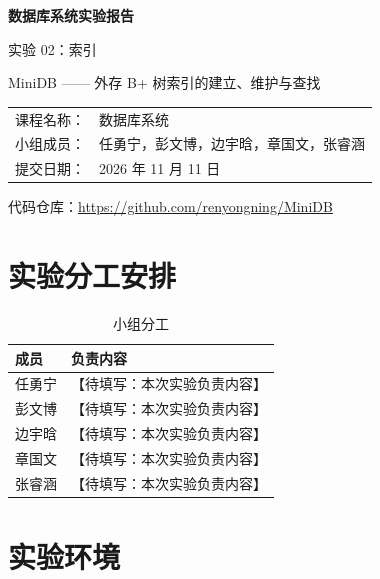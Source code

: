 \documentclass[11pt,a4paper]{ctexart}
\newcommand{\TODO}[1]{\textcolor{todo}{【待填写：#1】}}
\begin{document}
\begin{titlepage}
  \centering
  \vspace*{3cm}
  {\Huge\bfseries 数据库系统实验报告\par}
  \vspace{1cm}
  {\LARGE 实验 02：索引\par}
  \vspace{0.6cm}
  {\large MiniDB —— 外存 B+ 树索引的建立、维护与查找\par}
  \vspace{3cm}
  \begin{tabular}{rl}
    课程名称： & 数据库系统 \\[4pt]
    小组成员： & 任勇宁，彭文博，边宇晗，章国文，张睿涵 \\[4pt]
    提交日期： & 2026 年 11 月 11 日 \\
  \end{tabular}
  \vfill
  {\small 代码仓库：\url{https://github.com/renyongning/MiniDB}\par}
\end{titlepage}

\tableofcontents
\newpage

\section{实验分工安排}

\begin{table}[H]
  \centering
  \caption{小组分工}
  \begin{tabularx}{\textwidth}{l X}
    \toprule
    成员 & 负责内容 \\
    \midrule
    任勇宁 & \TODO{本次实验负责内容} \\
    彭文博 & \TODO{本次实验负责内容} \\
    边宇晗 & \TODO{本次实验负责内容} \\
    章国文 & \TODO{本次实验负责内容} \\
    张睿涵 & \TODO{本次实验负责内容} \\
    \bottomrule
  \end{tabularx}
\end{table}

\section{实验环境}
\end{document}
